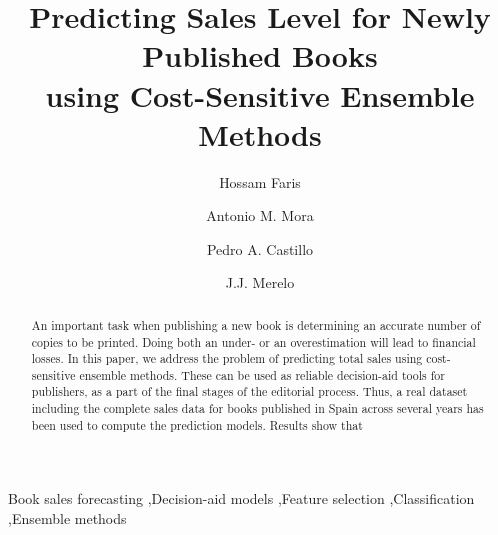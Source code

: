 \documentclass[a4paper,10pt,onecolumn,preprint,3p]{elsarticle}
\begin{document}
\begin{frontmatter}

\title{Predicting Sales Level for Newly Published Books \\
using Cost-Sensitive Ensemble Methods}


\author[abd]{Hossam Faris}
\author[ugrtstc]{Antonio M. Mora}
\author[ugratc]{Pedro A. Castillo}
\author[ugratc]{J.J. Merelo}


\address[abd]{Business Information Technology Department, King Abdullah II School for Information Technology \\
The University of Jordan, Amman, Jordan}
\address[ugrtstc]{Department of Signal Theory, Telematics and Communications, ETSIIT and CITIC \\
University of Granada, Granada, Spain}
\address[ugratc]{Department of Computer Architecture and Computer Technology, ETSIIT and CITIC \\
University of Granada, Granada, Spain}


\begin{abstract}
An important task when publishing a new book is determining an accurate number 
of copies to be printed. Doing both an under- or an overestimation will lead to financial losses.
In this paper, we address the problem of predicting total sales using cost-sensitive ensemble methods.
These can be used as reliable decision-aid tools for publishers, as a part of the final stages of the editorial process. 
Thus, a real dataset including the complete sales data for books published in Spain across several years has been used to compute the prediction models.
Results show that %

\end{abstract}


\begin{keyword}
Book sales forecasting \sep Decision-aid models \sep Feature selection \sep Classification \sep Ensemble methods
\end{keyword}

\end{frontmatter}
\end{document}
